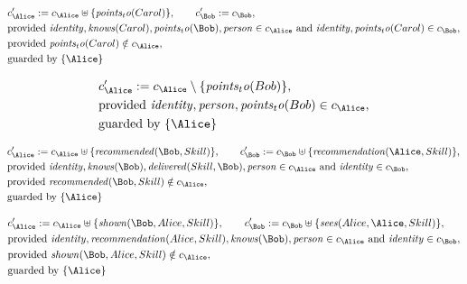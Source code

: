 \begin{align*}
&
c'_
{
\Alice
}
 := 
c_
{
\Alice
}
 \uplus 
\{
\mathit{
points_to
}
(
Carol
)
\}
, \qquad 
c'_
{
\Bob
}
 := 
c_
{
\Bob
}
,\\
&
\text{provided } 
\mathit{
identity
}
,
\mathit{
knows
}
(
Carol
)
,
\mathit{
points_to
}
(
\Bob
)
,
\mathit{
person
}
 \in c_
{
\Alice
}
 \text{ and } 
\mathit{
identity
}
,
\mathit{
points_to
}
(
Carol
)
 \in c_
{
\Bob
}
,\\
&
\text{provided } 
\mathit{
points_to
}
(
Carol
)
 \notin c_
{
\Alice
}
,\\
&
\text{guarded by } \{
\Alice
\}
\end{align*}

\begin{align*}
&
c'_
{
\Alice
}
 := 
c_
{
\Alice
}
 \setminus 
\{
\mathit{
points_to
}
(
Bob
)
\}
,\\
&
\text{provided } 
\mathit{
identity
}
,
\mathit{
person
}
,
\mathit{
points_to
}
(
Bob
)
 \in c_
{
\Alice
}
,\\
&
\text{guarded by } \{
\Alice
\}
\end{align*}

\begin{align*}
&
c'_
{
\Alice
}
 := 
c_
{
\Alice
}
 \uplus 
\{
\mathit{
recommended
}
(
\Bob
,
Skill
)
\}
, \qquad 
c'_
{
\Bob
}
 := 
c_
{
\Bob
}
 \uplus 
\{
\mathit{
recommendation
}
(
\Alice
,
Skill
)
\}
,\\
&
\text{provided } 
\mathit{
identity
}
,
\mathit{
knows
}
(
\Bob
)
,
\mathit{
delivered
}
(
Skill
,
\Bob
)
,
\mathit{
person
}
 \in c_
{
\Alice
}
 \text{ and } 
\mathit{
identity
}
 \in c_
{
\Bob
}
,\\
&
\text{provided } 
\mathit{
recommended
}
(
\Bob
,
Skill
)
 \notin c_
{
\Alice
}
,\\
&
\text{guarded by } \{
\Alice
\}
\end{align*}

\begin{align*}
&
c'_
{
\Alice
}
 := 
c_
{
\Alice
}
 \uplus 
\{
\mathit{
shown
}
(
\Bob
,
Alice
,
Skill
)
\}
, \qquad 
c'_
{
\Bob
}
 := 
c_
{
\Bob
}
 \uplus 
\{
\mathit{
sees
}
(
Alice
,
\Alice
,
Skill
)
\}
,\\
&
\text{provided } 
\mathit{
identity
}
,
\mathit{
recommendation
}
(
Alice
,
Skill
)
,
\mathit{
knows
}
(
\Bob
)
,
\mathit{
person
}
 \in c_
{
\Alice
}
 \text{ and } 
\mathit{
identity
}
 \in c_
{
\Bob
}
,\\
&
\text{provided } 
\mathit{
shown
}
(
\Bob
,
Alice
,
Skill
)
 \notin c_
{
\Alice
}
,\\
&
\text{guarded by } \{
\Alice
\}
\end{align*}
